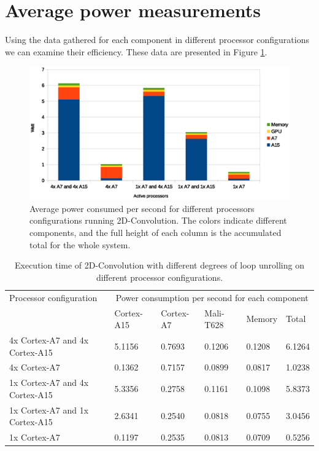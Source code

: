 \section{Average power measurements}
Using the data gathered for each component in different processor configurations we can examine their efficiency.
These data are presented in Figure \ref{power-configurations}.
\begin{figure}[H]
  \centering
  \includegraphics[width=160mm]{fig/power-configurations.eps}
  \caption{Average power consumed per second for different processors configurations running 2D-Convolution. The colors indicate different components, and the full height of each column is the accumulated total for the whole system.\label{overflow}} \label{power-configurations}
\end{figure}

\begin{table}[H]
  \begin{tabular}{llllll}
    \toprule
    Processor configuration         & \multicolumn{5}{c}{Power consumption per second for each component} \\
                                    & Cortex-A15  & Cortex-A7 & Mali-T628 & Memory  & Total \\
    \midrule
    4x Cortex-A7 and 4x Cortex-A15  & 5.1156          & 0.7693        & 0.1206        & 0.1208  & 6.1264 \\
    4x Cortex-A7                    & 0.1362          & 0.7157        & 0.0899        & 0.0817  & 1.0238 \\
    1x Cortex-A7 and 4x Cortex-A15  & 5.3356          & 0.2758        & 0.1161        & 0.1098  & 5.8373 \\
    1x Cortex-A7 and 1x Cortex-A15  & 2.6341          & 0.2540        & 0.0818        & 0.0755  & 3.0456 \\
    1x Cortex-A7                    & 0.1197          & 0.2535        & 0.0813        & 0.0709  & 0.5256 \\
    \bottomrule
  \end{tabular}
  \caption{Execution time of 2D-Convolution with different degrees of loop unrolling on different processor configurations. \label{overflow}}
\end{table}

